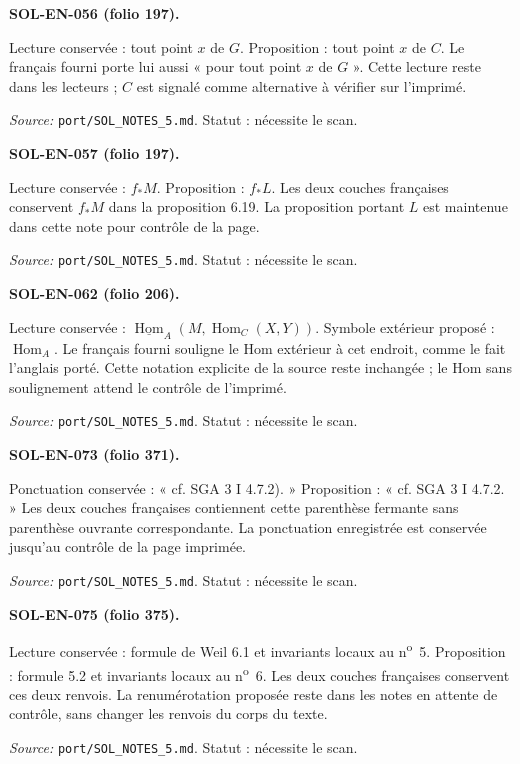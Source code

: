 \medskip\noindent\textbf{SOL-EN-056 (folio 197).}\par
Lecture conservée : tout point $x$ de $G$. Proposition : tout point $x$ de $C$.
Le français fourni porte lui aussi « pour tout point $x$ de $G$ ». Cette lecture reste dans les lecteurs ; $C$ est signalé comme alternative à vérifier sur l’imprimé.
\par\noindent\textit{Source: }\texttt{port/SOL\_NOTES\_5.md}. Statut : nécessite le scan.

\medskip\noindent\textbf{SOL-EN-057 (folio 197).}\par
Lecture conservée : $f_*M$. Proposition : $f_*L$.
Les deux couches françaises conservent $f_*M$ dans la proposition 6.19. La proposition portant $L$ est maintenue dans cette note pour contrôle de la page.
\par\noindent\textit{Source: }\texttt{port/SOL\_NOTES\_5.md}. Statut : nécessite le scan.

\medskip\noindent\textbf{SOL-EN-062 (folio 206).}\par
Lecture conservée : $\underline{\operatorname{Hom}}_A(M,\operatorname{Hom}_{C}(X,Y))$. Symbole extérieur proposé : $\operatorname{Hom}_A$.
Le français fourni souligne le Hom extérieur à cet endroit, comme le fait l’anglais porté. Cette notation explicite de la source reste inchangée ; le Hom sans soulignement attend le contrôle de l’imprimé.
\par\noindent\textit{Source: }\texttt{port/SOL\_NOTES\_5.md}. Statut : nécessite le scan.

\medskip\noindent\textbf{SOL-EN-073 (folio 371).}\par
Ponctuation conservée : « cf. SGA 3 I 4.7.2). » Proposition : « cf. SGA 3 I 4.7.2. »
Les deux couches françaises contiennent cette parenthèse fermante sans parenthèse ouvrante correspondante. La ponctuation enregistrée est conservée jusqu’au contrôle de la page imprimée.
\par\noindent\textit{Source: }\texttt{port/SOL\_NOTES\_5.md}. Statut : nécessite le scan.

\medskip\noindent\textbf{SOL-EN-075 (folio 375).}\par
Lecture conservée : formule de Weil 6.1 et invariants locaux au n\textsuperscript{o}~5. Proposition : formule 5.2 et invariants locaux au n\textsuperscript{o}~6.
Les deux couches françaises conservent ces deux renvois. La renumérotation proposée reste dans les notes en attente de contrôle, sans changer les renvois du corps du texte.
\par\noindent\textit{Source: }\texttt{port/SOL\_NOTES\_5.md}. Statut : nécessite le scan.

